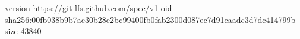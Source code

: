 version https://git-lfs.github.com/spec/v1
oid sha256:00fb038b9b7ac30b28e2bc99400fb0fab2300d087ec7d91eaadc3d7dc414799b
size 43840
